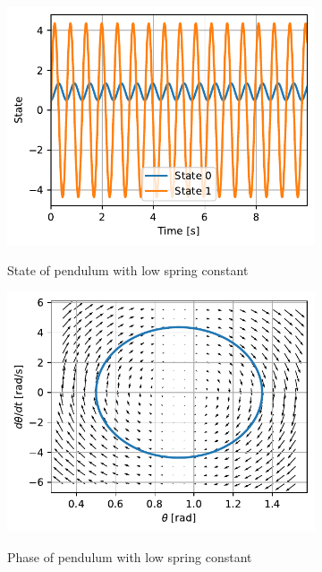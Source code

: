 \documentclass{cmc}
\begin{document}
\begin{figure}[H]
  \centering
  \begin{subfigure}[b]{0.49\textwidth}
    { \centering
      \includegraphics[width=\textwidth]{figures/State_Spring_Constant_2(x0_=_[0dot5,_0dot1]).pdf}
    }
    \caption{State of pendulum with low spring constant}
    \label{fig:state-pendulum-spring-constant-2}
  \end{subfigure}
  \begin{subfigure}[b]{0.49\textwidth}
    { \centering
      \includegraphics[width=\textwidth]{figures/Phase_Spring_Constant_2(x0_=_[0dot5,_0dot1]).pdf}
    }
    \caption{Phase of pendulum with low spring constant}
    \label{fig:phase-pendulum-spring-constant-2}
  \end{subfigure}
  \caption{}
  \label{fig:pendulum-spring-constant-2}
\end{figure}
\end{document}
